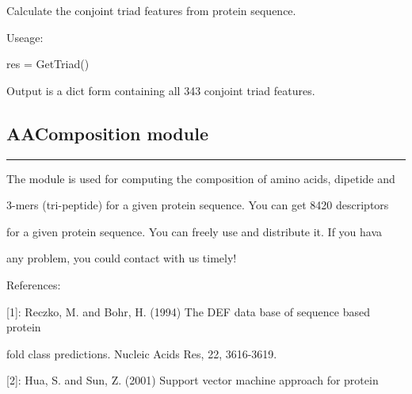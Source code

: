 \documentclass[letterpaper,10pt,english]{sphinxmanual}
\begin{document}
\begin{fulllineitems}
\begin{fulllineitems}
\end{fulllineitems}


\begin{fulllineitems}
\label{reference/PyProteinclass:PyProtein.PyProtein.GetTriad}
Calculate the conjoint triad features from protein sequence.

Useage:

res = GetTriad()

Output is a dict form containing all 343 conjoint triad features.

\end{fulllineitems}


\begin{fulllineitems}
\label{reference/PyProteinclass:PyProtein.PyProtein.Version}
\end{fulllineitems}


\end{fulllineitems}



\subsection{AAComposition module}
\label{reference/AAComposition:aacomposition-module}\label{reference/AAComposition:module-AAComposition}\label{reference/AAComposition::doc}

\bigskip\hrule{}\bigskip


The module is used for computing the composition of amino acids, dipetide and

3-mers (tri-peptide) for a given protein sequence. You can get 8420 descriptors

for a given protein sequence. You can freely use and distribute it. If you hava

any problem, you could contact with us timely!

References:

{[}1{]}: Reczko, M. and Bohr, H. (1994) The DEF data base of sequence based protein

fold class predictions. Nucleic Acids Res, 22, 3616-3619.

{[}2{]}: Hua, S. and Sun, Z. (2001) Support vector machine approach for protein
\end{document}
